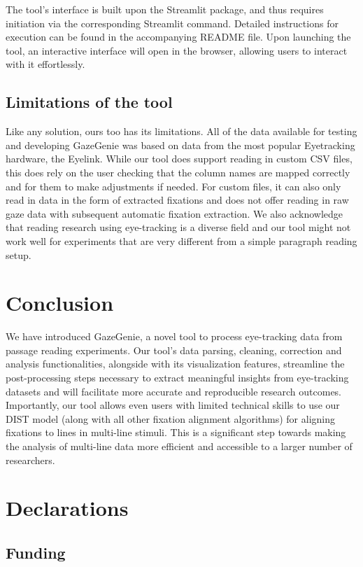 \documentclass[twocolumn]{article}
\begin{document}
The tool's interface is built upon the Streamlit package, and thus requires initiation via the corresponding Streamlit command. Detailed instructions for execution can be found in the accompanying README file. Upon launching the tool, an interactive interface will open in the browser, allowing users to interact with it effortlessly.

\subsection{Limitations of the tool}
Like any solution, ours too has its limitations. All of the data available for testing and developing GazeGenie was based on data from the most popular Eyetracking hardware, the Eyelink. While our tool does support reading in custom CSV files, this does rely on the user checking that the column names are mapped correctly and for them to make adjustments if needed. For custom files, it can also only read in data in the form of extracted fixations and does not offer reading in raw gaze data with subsequent automatic fixation extraction. We also acknowledge that reading research using eye-tracking is a diverse field and our tool might not work well for experiments that are very different from a simple paragraph reading setup.

\section{Conclusion}
We have introduced GazeGenie, a novel tool to process eye-tracking data from passage reading experiments. Our tool's data parsing, cleaning, correction and analysis functionalities, alongside with its visualization features, streamline the post-processing steps necessary to extract meaningful insights from eye-tracking datasets and will facilitate more accurate and reproducible research outcomes. Importantly, our tool allows even users with limited technical skills to use our DIST model (along with all other fixation alignment algorithms) for aligning fixations to lines in multi-line stimuli. This is a significant step towards making the analysis of multi-line data more efficient and accessible to a larger number of researchers. 

\section{Declarations}

\subsection{Funding}
\end{document}
